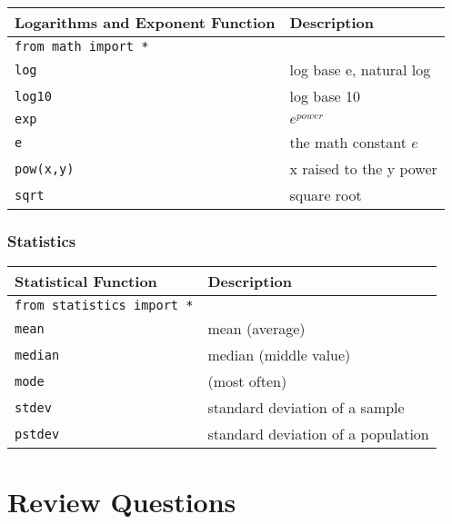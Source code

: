 \documentclass{book}
\newcommand{\passthrough}[1]{#1}
\begin{document}
\begin{longtable}[]{@{}ll@{}}
\toprule
Logarithms and Exponent Function & Description\tabularnewline
\midrule
\endhead
\passthrough{\lstinline!from math import *!} &\tabularnewline
\passthrough{\lstinline!log!} & log base e, natural log\tabularnewline
\passthrough{\lstinline!log10!} & log base 10\tabularnewline
\passthrough{\lstinline!exp!} & \(e^{power}\)\tabularnewline
\passthrough{\lstinline!e!} & the math constant \(e\)\tabularnewline
\passthrough{\lstinline!pow(x,y)!} & x raised to the y
power\tabularnewline
\passthrough{\lstinline!sqrt!} & square root\tabularnewline
\bottomrule
\end{longtable}

\hypertarget{statistics}{%
\subsubsection{Statistics}\label{statistics}}

\begin{longtable}[]{@{}ll@{}}
\toprule
Statistical Function & Description\tabularnewline
\midrule
\endhead
\passthrough{\lstinline!from statistics import *!} &\tabularnewline
\passthrough{\lstinline!mean!} & mean (average)\tabularnewline
\passthrough{\lstinline!median!} & median (middle value)\tabularnewline
\passthrough{\lstinline!mode!} & (most often)\tabularnewline
\passthrough{\lstinline!stdev!} & standard deviation of a
sample\tabularnewline
\passthrough{\lstinline!pstdev!} & standard deviation of a
population\tabularnewline
\bottomrule
\end{longtable}
    




    
        \hypertarget{review-questions}{%
\section{Review Questions}\label{review-questions}}
    
\end{document}
